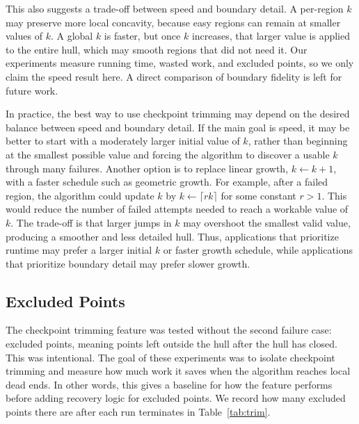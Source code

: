 \documentclass[10pt,twocolumn]{article}
\begin{document}
This also suggests a trade-off between speed and boundary detail. A per-region \(k\) may preserve more local concavity, because easy regions can remain at smaller values of \(k\). A global \(k\) is faster, but once \(k\) increases, that larger value is applied to the entire hull, which may smooth regions that did not need it. Our experiments measure running time, wasted work, and excluded points, so we only claim the speed result here. A direct comparison of boundary fidelity is left for future work.

In practice, the best way to use checkpoint trimming may depend on the desired balance between speed and boundary detail. If the main goal is speed, it may be better to start with a moderately larger initial value of \(k\), rather than beginning at the smallest possible value and forcing the algorithm to discover a usable \(k\) through many failures. Another option is to replace linear growth, \(k \leftarrow k+1\), with a faster schedule such as geometric growth. For example, after a failed region, the algorithm could update \(k\) by \(k \leftarrow \lceil rk\rceil\) for some constant \(r>1\). This would reduce the number of failed attempts needed to reach a workable value of \(k\). The trade-off is that larger jumps in \(k\) may overshoot the smallest valid value, producing a smoother and less detailed hull. Thus, applications that prioritize runtime may prefer a larger initial \(k\) or faster growth schedule, while applications that prioritize boundary detail may prefer slower growth.

\subsection{Excluded Points}
The checkpoint trimming feature was tested without the second failure case: excluded points, meaning points left outside the hull after the hull has closed. This was intentional. The goal of these experiments was to isolate checkpoint trimming and measure how much work it saves when the algorithm reaches local dead ends. In other words, this gives a baseline for how the feature performs before adding recovery logic for excluded points. We record how many excluded points there are after each run terminates in Table~\ref{tab:trim}.
\end{document}
